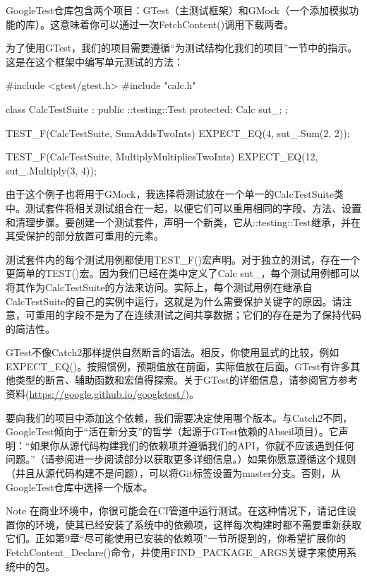 GoogleTest仓库包含两个项目：GTest（主测试框架）和GMock（一个添加模拟功能的库）。这意味着你可以通过一次FetchContent()调用下载两者。


为了使用GTest，我们的项目需要遵循“为测试结构化我们的项目”一节中的指示。这是在这个框架中编写单元测试的方法：


\begin{cpp}
#include <gtest/gtest.h>
#include "calc.h"

class CalcTestSuite : public ::testing::Test {
    protected:
    Calc sut_;
};

TEST_F(CalcTestSuite, SumAddsTwoInts) {
    EXPECT_EQ(4, sut_.Sum(2, 2));
}

TEST_F(CalcTestSuite, MultiplyMultipliesTwoInts) {
    EXPECT_EQ(12, sut_.Multiply(3, 4));
}
\end{cpp}

由于这个例子也将用于GMock，我选择将测试放在一个单一的CalcTestSuite类中。测试套件将相关测试组合在一起，以便它们可以重用相同的字段、方法、设置和清理步骤。要创建一个测试套件，声明一个新类，它从::testing::Test继承，并在其受保护的部分放置可重用的元素。

测试套件内的每个测试用例都使用TEST\_F()宏声明。对于独立的测试，存在一个更简单的TEST()宏。因为我们已经在类中定义了Calc sut\_，每个测试用例都可以将其作为CalcTestSuite的方法来访问。实际上，每个测试用例在继承自CalcTestSuite的自己的实例中运行，这就是为什么需要保护关键字的原因。请注意，可重用的字段不是为了在连续测试之间共享数据；它们的存在是为了保持代码的简洁性。

GTest不像Catch2那样提供自然断言的语法。相反，你使用显式的比较，例如EXPECT\_EQ()。按照惯例，预期值放在前面，实际值放在后面。GTest有许多其他类型的断言、辅助函数和宏值得探索。关于GTest的详细信息，请参阅官方参考资料(\url{https://google.github.io/googletest/})。

要向我们的项目中添加这个依赖，我们需要决定使用哪个版本。与Catch2不同，GoogleTest倾向于“活在新分支”的哲学（起源于GTest依赖的Abseil项目）。它声明：“如果你从源代码构建我们的依赖项并遵循我们的API，你就不应该遇到任何问题。”（请参阅进一步阅读部分以获取更多详细信息。）如果你愿意遵循这个规则（并且从源代码构建不是问题），可以将Git标签设置为master分支。否则，从GoogleTest仓库中选择一个版本。

\begin{myNotic}{Note}
在商业环境中，你很可能会在CI管道中运行测试。在这种情况下，请记住设置你的环境，使其已经安装了系统中的依赖项，这样每次构建时都不需要重新获取它们。正如第9章“尽可能使用已安装的依赖项”一节所提到的，你希望扩展你的FetchContent\_Declare()命令，并使用FIND\_PACKAGE\_ARGS关键字来使用系统中的包。
\end{myNotic}

